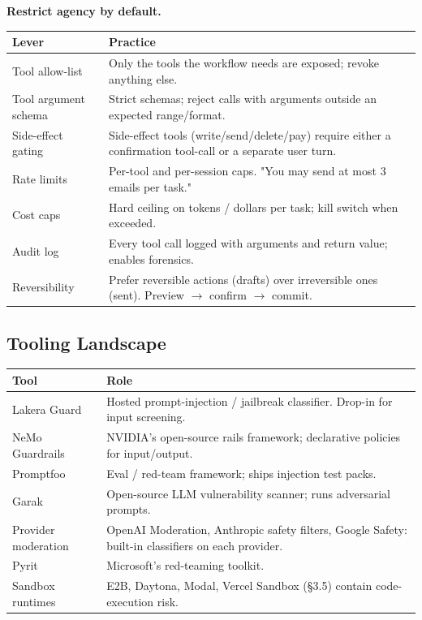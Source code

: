\documentclass[a4paper,11pt]{article}
\begin{document}
\textbf{Restrict agency by default.}

\begin{center}\small
\begin{tabular}{p{4cm} p{8.5cm}}
  \toprule
  \textbf{Lever} & \textbf{Practice} \\
  \midrule
  Tool allow-list      & Only the tools the workflow needs are exposed; revoke anything else. \\
  Tool argument schema & Strict schemas; reject calls with arguments outside an expected range/format. \\
  Side-effect gating   & Side-effect tools (write/send/delete/pay) require either a confirmation tool-call or a separate user turn. \\
  Rate limits          & Per-tool and per-session caps. "You may send at most 3 emails per task." \\
  Cost caps            & Hard ceiling on tokens / dollars per task; kill switch when exceeded. \\
  Audit log            & Every tool call logged with arguments and return value; enables forensics. \\
  Reversibility        & Prefer reversible actions (drafts) over irreversible ones (sent). Preview $\to$ confirm $\to$ commit. \\
  \bottomrule
\end{tabular}
\end{center}

\subsection{Tooling Landscape}

\begin{center}\small
\begin{tabular}{p{3cm} p{9.5cm}}
  \toprule
  \textbf{Tool} & \textbf{Role} \\
  \midrule
  Lakera Guard      & Hosted prompt-injection / jailbreak classifier. Drop-in for input screening. \\
  NeMo Guardrails   & NVIDIA's open-source rails framework; declarative policies for input/output. \\
  Promptfoo         & Eval / red-team framework; ships injection test packs. \\
  Garak             & Open-source LLM vulnerability scanner; runs adversarial prompts. \\
  Provider moderation & OpenAI Moderation, Anthropic safety filters, Google Safety: built-in classifiers on each provider. \\
  Pyrit             & Microsoft's red-teaming toolkit. \\
  Sandbox runtimes  & E2B, Daytona, Modal, Vercel Sandbox (§3.5) \textemdash{} contain code-execution risk. \\
  \bottomrule
\end{tabular}
\end{center}
\end{document}
